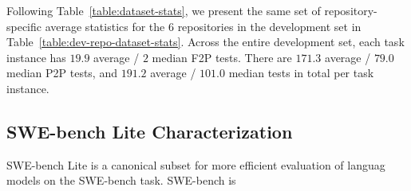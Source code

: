 

Following Table~\ref{table:dataset-stats}, we present the same set of repository-specific average statistics for the $6$ repositories in the development set in Table~\ref{table:dev-repo-dataset-stats}.
Across the entire development set, each task instance has $19.9$ average / $2$ median F2P tests.
There are $171.3$ average / $79.0$ median P2P tests, and $191.2$ average / $101.0$ median tests in total per task instance.



\subsection{SWE-bench Lite Characterization}
\label{appx:benchmark:lite}
SWE-bench Lite is a canonical subset for more efficient evaluation of languag models on the SWE-bench task.
SWE-bench is 
